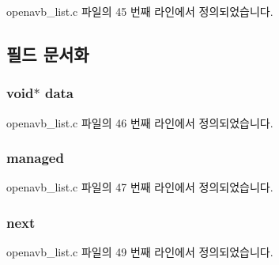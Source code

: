 openavb\+\_\+list.\+c 파일의 45 번째 라인에서 정의되었습니다.



\subsection{필드 문서화}
\subsubsection[{\texorpdfstring{data}{data}}]{\setlength{\rightskip}{0pt plus 5cm}void$\ast$ data}\hypertarget{structopenavb__list__node_a735984d41155bc1032e09bece8f8d66d}{}\label{structopenavb__list__node_a735984d41155bc1032e09bece8f8d66d}


openavb\+\_\+list.\+c 파일의 46 번째 라인에서 정의되었습니다.

\subsubsection[{\texorpdfstring{managed}{managed}}]{ managed}\hypertarget{structopenavb__list__node_a8ff69266b2f44d218fdfe0c9d6950409}{}\label{structopenavb__list__node_a8ff69266b2f44d218fdfe0c9d6950409}


openavb\+\_\+list.\+c 파일의 47 번째 라인에서 정의되었습니다.

\subsubsection[{\texorpdfstring{next}{next}}]{ next}\hypertarget{structopenavb__list__node_a43567a94506b725de2077e8ea54e9cd7}{}\label{structopenavb__list__node_a43567a94506b725de2077e8ea54e9cd7}


openavb\+\_\+list.\+c 파일의 49 번째 라인에서 정의되었습니다.

